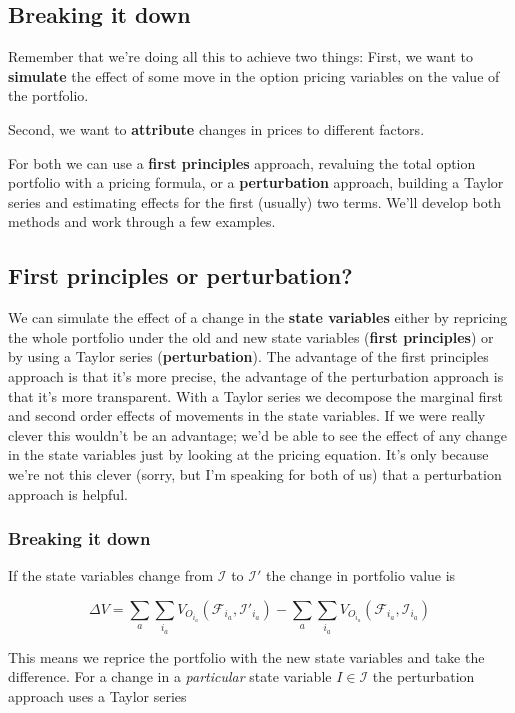 \subsection{Breaking it down}

Remember that we're doing all this to achieve two things: First, we want to \textbf{simulate} the effect of some move in the option pricing variables on the value of the portfolio.

 Second, we want to \textbf{attribute} changes in prices to different factors. 
 
For both we can use a \textbf{first principles} approach, revaluing the total option portfolio with a pricing formula, or a \textbf{perturbation} approach, building a Taylor series and estimating effects for the first (usually) two terms. We'll develop both methods and work through a few examples.

\subsection{First principles or perturbation?}

We can simulate the effect of a change in the \textbf{state variables} either by repricing the whole portfolio under the old and new state variables (\textbf{first principles}) or by using a Taylor series (\textbf{perturbation}). The advantage of the first principles approach is that it's more precise, the advantage of the perturbation approach is that it's more transparent. With a Taylor series we  decompose the marginal first and second order effects of movements in the state variables. If we were really clever this wouldn't be an advantage; we'd be able to see the effect of any change in the state variables just by looking at the pricing equation. It's only because we're not this clever (sorry, but I'm speaking for both of us) that a perturbation approach is helpful.

\subsubsection{Breaking it down}

If the state variables change from $\mathcal{I}$ to $\mathcal{I'}$ the change in portfolio value is

\[ \Delta V =  \sum_{a}\sum_{i_a}V_{O_{i_a}}(\mathcal{F}_{i_a},\mathcal{I'}_{i_a}) - \sum_{a}\sum_{i_a}V_{O_{i_a}}(\mathcal{F}_{i_a},\mathcal{I}_{i_a})  \]
 
 This means we reprice the portfolio with the new state variables and take the difference. For a change in a \textit{particular} state variable $I \in \mathcal{I}$ the perturbation approach uses a Taylor series
 
